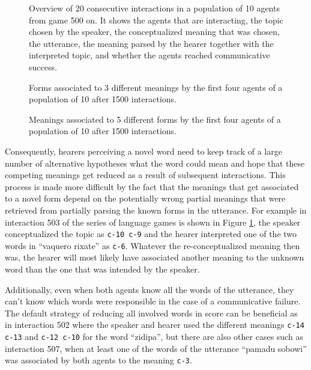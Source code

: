 \begin{figure}[p]
  \caption{Overview of 20 consecutive interactions in a population of
    10 agents from game 500 on. It shows the agents that are
    interacting, the topic chosen by the speaker, the conceptualized
    meaning that was chosen, the utterance, the meaning parsed by the
    hearer together with the interpreted topic, and whether the agents
    reached communicative success.}
  \label{f:sgg-mw-structured-trace}
\end{figure}

\startfiguregroup

\begin{figure}[ph]
  
  \caption{Forms associated to 3 different meanings by the first four
    agents of a population of 10 after 1500 interactions.}
  \label{f:sgg-mw-structured-lexicon-meanings-1500}
\end{figure}

\begin{figure}[ph]
  
  \caption{Meanings associated to 5 different forms by the first four
    agents of a population of 10 after 1500 interactions.}
  \label{f:sgg-mw-structured-lexicon-forms-1500}
\end{figure}

\stopfiguregroup

Consequently, hearers perceiving a novel word need to keep track of a
large number of alternative hypotheses what the word could mean and
hope that these competing meanings get reduced as a result of
subsequent interactions.  This process is made more difficult by the
fact that the meanings that get associated to a novel form depend on
the potentially wrong partial meanings that were retrieved from
partially parsing the known forms in the utterance. For example in
interaction 503 of the series of language games is shown in Figure
\ref{f:sgg-mw-structured-trace}, the speaker conceptualized the topic
as \texttt{c-10 c-9} and the hearer interpreted one of the two words
in ``vaquero rixate'' as \texttt{c-6}. Whatever the re-conceptualized
meaning then was, the hearer will most likely have associated another
meaning to the unknown word than the one that was intended by the
speaker.

Additionally, even when both agents know all the words of the
utterance, they can't know which words were responsible in the case of
a communicative failure. The default strategy of reducing all involved
words in score can be beneficial as in interaction 502 where the
speaker and hearer used the different meanings \texttt{c-14 c-13} and
\texttt{c-12 c-10} for the word ``zidipa'', but there are also other
cases such as interaction 507, when at least one of the words of the
utterance ``pamadu sobowi'' was associated by both agents to the
meaning \texttt{c-3}.

